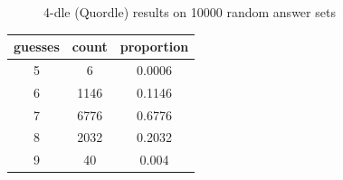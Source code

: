\documentclass[11pt, oneside]{article} 	%
\begin{document}
\begin{figure}[!htb]
 \centering
 \qquad
 \caption{4-dle (Quordle) results on 10000 random answer sets}%
\end{figure}

\begin{center}
\begin{tabular}{ |c|c|c| }
 \hline
guesses & count & proportion \\
 \hline
5 & 6 & 0.0006 \\
6 & 1146 & 0.1146 \\
7 & 6776 & 0.6776 \\
8 & 2032 & 0.2032 \\
9 & 40 & 0.004 \\
 \hline
\end{tabular}
\end{center}
\end{document}
